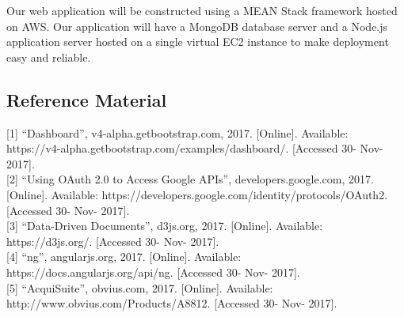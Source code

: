 \documentclass[journal,10pt,onecolumn,compsoc]{IEEEtran}
\begin{document}
    \noindent Our web application will be constructed using a MEAN Stack framework hosted on AWS. Our application will have a MongoDB database server and a Node.js application server hosted on a single virtual EC2 instance to make deployment easy and reliable.
   
	\subsection{Reference Material}
	{[1]} ``Dashboard'', v4-alpha.getbootstrap.com, 2017. [Online]. Available: https://v4-alpha.getbootstrap.com/examples/dashboard/. [Accessed 30- Nov- 2017]. \\
	{[2]} ``Using OAuth 2.0 to Access Google APIs'', developers.google.com, 2017. [Online]. Available: 		https://developers.google.com/identity/protocols/OAuth2. [Accessed 30- Nov- 2017]. \\
	{[3]} ``Data-Driven Documents'', d3js.org, 2017. [Online]. Available: https://d3js.org/. [Accessed 30- Nov- 2017]. \\
	{[4]} ``ng'', angularjs.org, 2017. [Online]. Available: https://docs.angularjs.org/api/ng. [Accessed 30- Nov- 2017]. \\
	{[5]} ``AcquiSuite'', obvius.com, 2017. [Online]. Available: http://www.obvius.com/Products/A8812. [Accessed 30- Nov- 2017]. \\
	
\end{document}

